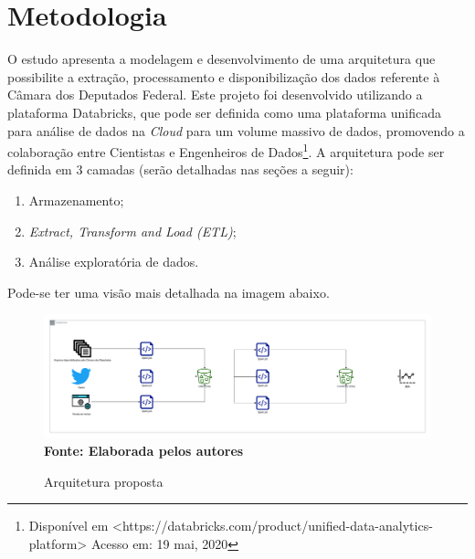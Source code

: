 \chapter{Metodologia}
\label{metodologia}
O estudo apresenta a modelagem e desenvolvimento de uma arquitetura que possibilite a extração, processamento e disponibilização dos dados referente à Câmara dos Deputados Federal. Este projeto foi desenvolvido utilizando a plataforma Databricks, que pode ser definida como uma plataforma unificada para análise de dados na \textit{Cloud} para um volume massivo de dados, promovendo a colaboração entre Cientistas e Engenheiros de Dados\footnote{Disponível em <https://databricks.com/product/unified-data-analytics-platform> Acesso em: 19 mai, 2020}.
A arquitetura pode ser definida em 3 camadas (serão detalhadas nas seções a seguir):
\begin{enumerate} 
 \item [1)] Armazenamento;
 \item [2)] \textit{Extract, Transform and Load (ETL)};
 \item [3)] Análise exploratória de dados.
\end{enumerate} 

Pode-se ter uma visão mais detalhada na imagem abaixo.

\begin{figure}[!ht]
	\centering	
	\caption[\hspace{0.1cm}Arquitetura proposta]{Arquitetura proposta}
	  \vspace{-0.4cm}
	\includegraphics[width=.8\textwidth]{figuras/tcc_arch.png}
	 \vspace{-0.3cm}
	\\\textbf{\footnotesize Fonte: Elaborada pelos autores}
	\label{fig:tela1}
\end{figure}

